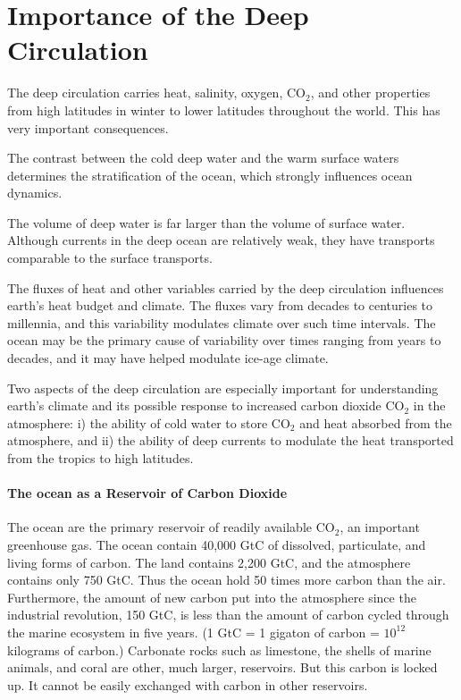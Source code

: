 \section{Importance of the Deep Circulation}
The deep circulation carries heat, salinity,
oxygen, CO$_2$, and other properties from high latitudes in winter to lower
latitudes throughout the world. This has very important consequences.

\begin{enumerate}
\vitem The contrast between the cold deep water and the warm surface waters determines the stratification of the ocean, which strongly influences ocean dynamics.

\vitem The volume of deep water is far larger than the volume of surface
water. Although currents in the deep ocean are relatively weak, they have
transports comparable to the surface transports.

\vitem The fluxes of heat and other variables carried by the deep circulation influences
earth's heat budget and climate. The fluxes  vary from decades to centuries
to millennia, and this variability modulates climate over such time intervals. The
ocean may be the primary cause of variability over times ranging from years to
decades, and it may have helped modulate ice-age climate.

\end{enumerate}
Two aspects of the deep circulation are especially important for understanding
earth's climate and its possible response to increased carbon dioxide
CO$_2$ in the atmosphere: i) the ability of cold water to store CO$_2$ and heat absorbed from the
atmosphere, and ii) the ability of deep currents to modulate the heat
transported from the tropics to high latitudes.

\paragraph{The ocean as a Reservoir of Carbon Dioxide}
The ocean are the primary reservoir of readily available CO$_2$, an
important greenhouse gas. The ocean contain 40,000 GtC of dissolved, particulate,
and living forms of carbon. The land contains 2,200 GtC, and the atmosphere contains
only 750 GtC. Thus the ocean hold 50 times more carbon than the air. Furthermore,
the amount of new carbon put into the atmosphere since the industrial revolution,
150 GtC, is less than the amount of carbon cycled through the marine ecosystem in
five years. (1 GtC = 1 gigaton of carbon = $10^{12}$ kilograms of carbon.) Carbonate
rocks such as limestone, the shells of marine animals, and coral are other, much
larger, reservoirs. But this carbon is locked up. It cannot be easily exchanged with
carbon in other reservoirs.

